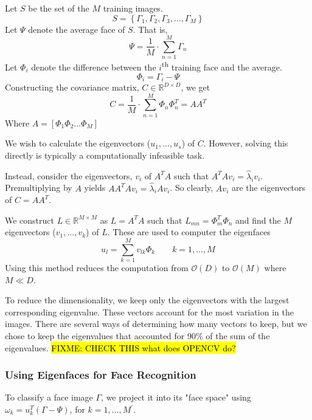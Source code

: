 \documentclass{article}
\begin{document}
\vspace{12pt} \noindent Let $S$ be the set of the $M$ training images.
\begin{equation}
	S = \left\{\Gamma_1, \Gamma_2, \Gamma_3, \ldots, \Gamma_M\right\}
\end{equation}
Let $\Psi$ denote the average face of $S$. That is,
\begin{equation}
	\Psi = \frac{1}{M}\cdot\sum_{n=1}^{M}\Gamma_n
\end{equation}
Let $\Phi_i$ denote the difference between the $i$\textsuperscript{th} training face and the average.
\begin{equation}
	\Phi_i = \Gamma_i - \Psi
\end{equation}
Constructing the covariance matrix, $C \in \mathbb{R}^{D\times D}$, we get
\begin{equation}
	C = \frac{1}{M}\cdot\sum_{n=1}^{M}\Phi_n \Phi_n^T
	  = AA^T
\end{equation}
Where $A = [\Phi_1 \Phi_2 \ldots \Phi_M]$

We wish to calculate the eigenvectors ($u_1, \ldots, u_s$) of $C$. However, solving this directly is typically a computationally infeasible task.

Instead, consider the eigenvectors, $v_i$ of $A^TA$ such that $A^TAv_i=\widehat{\lambda}_iv_i$. Premultiplying by $A$ yields $AA^TAv_i=\widehat{\lambda}_iAv_i$. So clearly, $Av_i$ are the eigenvectors of $C=AA^T$.

We construct $L \in \mathbb{R}^{M\times M}$ as $L = A^T A$ such that $L_{mn} = \Phi^T_m \Phi_n$ and find the $M$ eigenvectors ($v_1, \ldots, v_k$) of $L$. These are used to computer the eigenfaces
\begin{equation}
	u_l = \sum_{k=1}^{M}v_{lk}\Phi_k \qquad k=1, \ldots, M
\end{equation}
Using this method reduces the computation from $\mathcal{O}(D)$ to $\mathcal{O}(M)$ where $M\ll D$.

To reduce the dimensionality, we keep only the eigenvectors with the largest corresponding eigenvalue. These vectors account for the most variation in the images. There are several ways of determining how many vectors to keep, but we chose to keep the eigenvalues that accounted for 90\% of the sum of the eigenvalues. \hl{FIXME: CHECK THIS what does OPENCV do?}

\subsubsection{Using Eigenfaces for Face Recognition}
To classify a face image $\Gamma$, we project it into its "face space" using $\omega_k = u^T_k(\Gamma - \Psi)$, for $k = 1, \ldots, M^\prime$.
\end{document}
